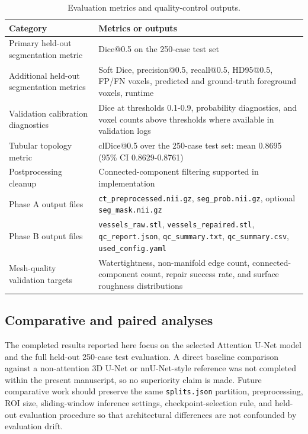 \documentclass[anonymous]{iopjournal}
\begin{document}
\begin{table}[!htbp]
\centering
\caption{Evaluation metrics and quality-control outputs.}
\label{tab:evaluation}
\begin{threeparttable}
\footnotesize
\begin{tabularx}{0.92\textwidth}{L{0.35\textwidth}Y}
\toprule
\textbf{Category} & \textbf{Metrics or outputs} \\
\midrule
Primary held-out segmentation metric & Dice@0.5 on the 250-case test set \\
Additional held-out segmentation metrics & Soft Dice, precision@0.5, recall@0.5, HD95@0.5, FP/FN voxels, predicted and ground-truth foreground voxels, runtime \\
Validation calibration diagnostics & Dice at thresholds 0.1-0.9, probability diagnostics, and voxel counts above thresholds where available in validation logs \\
Tubular topology metric & clDice@0.5 over the 250-case test set: mean 0.8695 (95\% CI 0.8629-0.8761) \\
Postprocessing cleanup & Connected-component filtering supported in implementation \\
Phase A output files & \texttt{ct\_preprocessed.nii.gz}, \texttt{seg\_prob.nii.gz}, optional \texttt{seg\_mask.nii.gz} \\
Phase B output files & \texttt{vessels\_raw.stl}, \texttt{vessels\_repaired.stl}, \texttt{qc\_report.json}, \texttt{qc\_summary.txt}, \texttt{qc\_summary.csv}, \texttt{used\_config.yaml} \\
Mesh-quality validation targets & Watertightness, non-manifold edge count, connected-component count, repair success rate, and surface roughness distributions \\
\bottomrule
\end{tabularx}
\end{threeparttable}
\end{table}

\subsection{Comparative and paired analyses}
\label{subsec:paired}

The completed results reported here focus on the selected Attention U-Net model and the full held-out 250-case test evaluation. A direct baseline comparison against a non-attention 3D U-Net or nnU-Net-style reference was not completed within the present manuscript, so no superiority claim is made. Future comparative work should preserve the same \texttt{splits.json} partition, preprocessing, ROI size, sliding-window inference settings, checkpoint-selection rule, and held-out evaluation procedure so that architectural differences are not confounded by evaluation drift.
\end{document}
